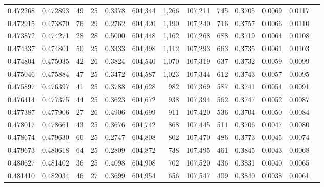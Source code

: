 \begin{tabular}{rrrrrrrrrrrrr}
0.472268 & 0.472893 &    49 &  25 &                                     0.3378 & 604,344 &   1,266 & 107,211 &     745 & 0.3705 & 0.0069 & 0.0117 \\
0.472915 & 0.473870 &    76 &  29 &                                     0.2762 & 604,420 &   1,190 & 107,240 &     716 & 0.3757 & 0.0066 & 0.0110 \\
0.473872 & 0.474271 &    28 &  28 &                                     0.5000 & 604,448 &   1,162 & 107,268 &     688 & 0.3719 & 0.0064 & 0.0108 \\
0.474337 & 0.474801 &    50 &  25 &                                     0.3333 & 604,498 &   1,112 & 107,293 &     663 & 0.3735 & 0.0061 & 0.0103 \\
0.474804 & 0.475035 &    42 &  26 &                                     0.3824 & 604,540 &   1,070 & 107,319 &     637 & 0.3732 & 0.0059 & 0.0099 \\
0.475046 & 0.475884 &    47 &  25 &                                     0.3472 & 604,587 &   1,023 & 107,344 &     612 & 0.3743 & 0.0057 & 0.0095 \\
0.475897 & 0.476397 &    41 &  25 &                                     0.3788 & 604,628 &     982 & 107,369 &     587 & 0.3741 & 0.0054 & 0.0091 \\
0.476414 & 0.477375 &    44 &  25 &                                     0.3623 & 604,672 &     938 & 107,394 &     562 & 0.3747 & 0.0052 & 0.0087 \\
0.477387 & 0.477906 &    27 &  26 &                                     0.4906 & 604,699 &     911 & 107,420 &     536 & 0.3704 & 0.0050 & 0.0084 \\
0.478017 & 0.478661 &    43 &  25 &                                     0.3676 & 604,742 &     868 & 107,445 &     511 & 0.3706 & 0.0047 & 0.0080 \\
0.478674 & 0.479630 &    66 &  25 &                                     0.2747 & 604,808 &     802 & 107,470 &     486 & 0.3773 & 0.0045 & 0.0074 \\
0.479673 & 0.480618 &    64 &  25 &                                     0.2809 & 604,872 &     738 & 107,495 &     461 & 0.3845 & 0.0043 & 0.0068 \\
0.480627 & 0.481402 &    36 &  25 &                                     0.4098 & 604,908 &     702 & 107,520 &     436 & 0.3831 & 0.0040 & 0.0065 \\
0.481410 & 0.482034 &    46 &  27 &                                     0.3699 & 604,954 &     656 & 107,547 &     409 & 0.3840 & 0.0038 & 0.0061 \\

\end{tabular}
